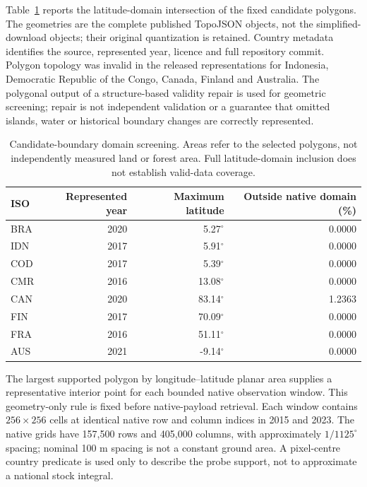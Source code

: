 \documentclass[11pt,a4paper]{article}
\begin{document}
Table~\ref{tab:domain} reports the latitude-domain intersection of the fixed candidate polygons. The geometries are the complete published TopoJSON objects, not the simplified-download objects; their original quantization is retained. Country metadata identifies the source, represented year, licence and full repository commit. Polygon topology was invalid in the released representations for Indonesia, Democratic Republic of the Congo, Canada, Finland and Australia. The polygonal output of a structure-based validity repair is used for geometric screening; repair is not independent validation or a guarantee that omitted islands, water or historical boundary changes are correctly represented.

\begin{table}[htbp]
\centering\small
\caption{Candidate-boundary domain screening. Areas refer to the selected polygons, not independently measured land or forest area. Full latitude-domain inclusion does not establish valid-data coverage.}\label{tab:domain}
\begin{tabular}{lrrr}
\toprule
ISO & Represented year & Maximum latitude & Outside native domain (\%)\\\midrule
BRA & 2020 & 5.27$^\circ$ & 0.0000 \\
IDN & 2017 & 5.91$^\circ$ & 0.0000 \\
COD & 2017 & 5.39$^\circ$ & 0.0000 \\
CMR & 2016 & 13.08$^\circ$ & 0.0000 \\
CAN & 2020 & 83.14$^\circ$ & 1.2363 \\
FIN & 2017 & 70.09$^\circ$ & 0.0000 \\
FRA & 2016 & 51.11$^\circ$ & 0.0000 \\
AUS & 2021 & -9.14$^\circ$ & 0.0000 \\
\bottomrule
\end{tabular}
\end{table}

The largest supported polygon by longitude--latitude planar area supplies a representative interior point for each bounded native observation window. This geometry-only rule is fixed before native-payload retrieval. Each window contains $256\times256$ cells at identical native row and column indices in 2015 and 2023. The native grids have 157,500 rows and 405,000 columns, with approximately $1/1125^\circ$ spacing; nominal 100 m spacing is not a constant ground area. A pixel-centre country predicate is used only to describe the probe support, not to approximate a national stock integral.
\end{document}
